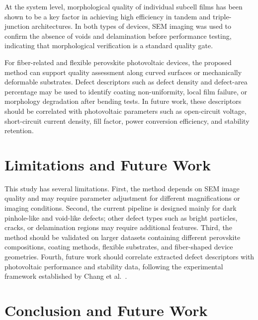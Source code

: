 \documentclass[pdflatex,sn-mathphys-num,iicol]{sn-jnl}
\theoremstyle{thmstyleone}
\theoremstyle{thmstyletwo}
\theoremstyle{thmstylethree}
\begin{document}
At the system level, morphological quality of individual subcell
films has been shown to be a key factor in achieving high efficiency
in tandem \cite{chang2026} and triple-junction \cite{zheng2025}
architectures. In both types of devices, SEM imaging was used to
confirm the absence of voids and delamination before performance
testing, indicating that morphological verification is a standard
quality gate.

For fiber-related and flexible perovskite photovoltaic devices, the
proposed method can support quality assessment along curved surfaces
or mechanically deformable substrates. Defect descriptors such as
defect density and defect-area percentage may be used to identify
coating non-uniformity, local film failure, or morphology degradation
after bending tests. In future work, these descriptors should be
correlated with photovoltaic parameters such as open-circuit voltage,
short-circuit current density, fill factor, power conversion
efficiency, and stability retention.


\section{Limitations and Future Work}\label{sec:limitations}

This study has several limitations. First, the method depends on SEM
image quality and may require parameter adjustment for different
magnifications or imaging conditions. Second, the current pipeline
is designed mainly for dark pinhole-like and void-like defects; other
defect types such as bright particles, cracks, or delamination
regions may require additional features. Third, the method should be
validated on larger datasets containing different perovskite
compositions, coating methods, flexible substrates, and fiber-shaped
device geometries. Fourth, future work should correlate extracted
defect descriptors with photovoltaic performance and stability data,
following the experimental framework established by Chang et al.\
\cite{chang2026}.




\section*{Conclusion and Future Work}\label{sec:conclusion}
\end{document}
